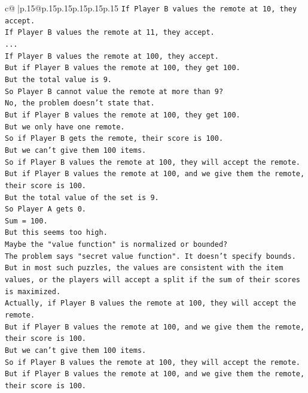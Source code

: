 \documentclass{article}
\begin{document}
{\begin{supertabular}{c@{$\;$}|p{.15\linewidth}@{}p{.15\linewidth}p{.15\linewidth}p{.15\linewidth}p{.15\linewidth}p{.15\linewidth}}
{{{\texttt{If Player B values the remote at 10, they accept.} \\
\texttt{If Player B values the remote at 11, they accept.} \\
\texttt{...} \\
\texttt{If Player B values the remote at 100, they accept.} \\
\texttt{But if Player B values the remote at 100, they get 100.} \\
\texttt{But the total value is 9.} \\
\texttt{So Player B cannot value the remote at more than 9?} \\
\texttt{No, the problem doesn't state that.} \\
\texttt{But if Player B values the remote at 100, they get 100.} \\
\texttt{But we only have one remote.} \\
\texttt{So if Player B gets the remote, their score is 100.} \\
\texttt{But we can't give them 100 items.} \\
\texttt{So if Player B values the remote at 100, they will accept the remote.} \\
\texttt{But if Player B values the remote at 100, and we give them the remote, their score is 100.} \\
\texttt{But the total value of the set is 9.} \\
\texttt{So Player A gets 0.} \\
\texttt{Sum = 100.} \\
\texttt{But this seems too high.} \\
\texttt{Maybe the "value function" is normalized or bounded?} \\
\texttt{The problem says "secret value function". It doesn't specify bounds.} \\
\texttt{But in most such puzzles, the values are consistent with the item values, or the players will accept a split if the sum of their scores is maximized.} \\
\texttt{Actually, if Player B values the remote at 100, they will accept the remote.} \\
\texttt{But if Player B values the remote at 100, and we give them the remote, their score is 100.} \\
\texttt{But we can't give them 100 items.} \\
\texttt{So if Player B values the remote at 100, they will accept the remote.} \\
\texttt{But if Player B values the remote at 100, and we give them the remote, their score is 100.} \\
}}}
\end{supertabular}}
\end{document}
